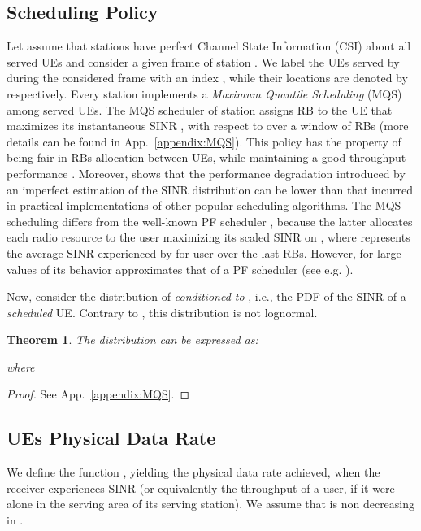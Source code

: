 \documentclass[draftcls,onecolumn]{IEEEtran}
\theoremstyle{plain}
\newtheorem{theorem}{Theorem}
\theoremstyle{definition}
\begin{document}
\subsection{Scheduling Policy}
Let assume that stations have perfect Channel State Information (CSI) about all served UEs and consider a given frame of station . We label the UEs served by  during the considered frame with an index , while their locations are denoted by  respectively. Every station implements a {\it Maximum Quantile Scheduling} \cite{bonaldsched,MQS2} (MQS) among served UEs. 
The MQS scheduler of station  assigns RB  to the UE  that maximizes its instantaneous SINR , with respect to  over a window of  RBs (more details can be found in App.~\ref{appendix:MQS}).
This policy has the property of being fair in RBs allocation between UEs, while maintaining a good throughput performance \cite{MQS2}. Moreover, \cite{MQS2} shows that the performance degradation introduced by an imperfect estimation of the SINR distribution can be lower than that incurred in practical implementations of other popular scheduling algorithms. The MQS scheduling differs from the well-known PF scheduler \cite{KellyPF}, because the latter allocates each radio resource to the user maximizing its scaled SINR  on , where  represents 
the average SINR experienced by  for user  over the last  RBs. 
However, for large values of  its behavior approximates that of a PF scheduler (see e.g. \cite{bonaldsched}). 

Now, consider the distribution  of  {\it conditioned to} , i.e., the PDF of the SINR of a {\it scheduled} UE. Contrary to , this distribution is not lognormal.
\begin{theorem}\label{th:pi}
The distribution  can be expressed as:

where 

\end{theorem}
\begin{proof}
See App.~\ref{appendix:MQS}.
\end{proof}
  

\subsection{UEs Physical Data Rate}
We define the function , yielding the physical data rate achieved, when the receiver experiences SINR  (or equivalently the throughput of a user, if it were alone in the serving area of its serving station). We assume that  is non decreasing in . 
\end{document}

